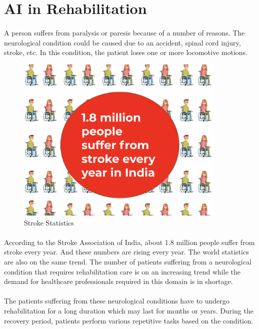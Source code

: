 \documentclass[12pt]{article}
\begin{document}
\newpage

\section{AI in Rehabilitation}
\paragraph{}
A person suffers from paralysis or paresis because of a number of reasons. The neurological condition could be caused due to an accident, spinal cord injury, stroke, etc. In this condition, the patient loses one or more locomotive motions. \\

\begin{figure}[h]
	\begin{center}
		\includegraphics[height=8cm,width=10cm]{StrokeStatistics}
	\end{center}
	\caption{Stroke Statistics}
\end{figure}

\paragraph{}
According to the Stroke Association of India, about 1.8 million people suffer from stroke every year. And these numbers are rising every year. The world statistics are also on the same trend. The number of patients suffering from a neurological condition that requires rehabilitation care is on an increasing trend while the demand for healthcare professionals required in this domain is in shortage.

\paragraph{}
The patients suffering from these neurological conditions have to undergo rehabilitation for a long duration which may last for months or years. During the recovery period, patients perform various repetitive tasks based on the condition.
\end{document}
